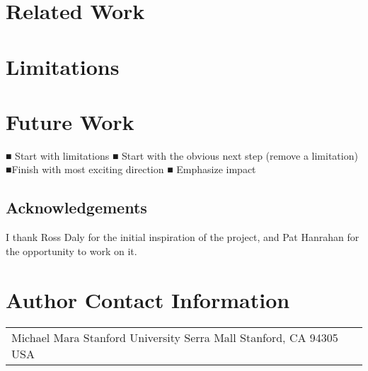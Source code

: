 \documentclass{article}
\begin{document}
\section{Related Work}
\section{Limitations}
\section{Future Work}
■ Start with limitations
■ Start with the obvious next step
(remove a limitation)
■Finish with most exciting direction
■ Emphasize impact


\subsection*{Acknowledgements}
I thank  Ross Daly for the initial inspiration of the project, and Pat Hanrahan for the opportunity to work on it.





\section*{Author Contact Information}

\hspace{-2mm}\begin{tabular}{p{}p{}}
Michael Mara \newline
Stanford University \newline
353 Serra Mall \newline
Stanford, CA 94305 \newline
USA\newline
\end{tabular}
\end{document}
